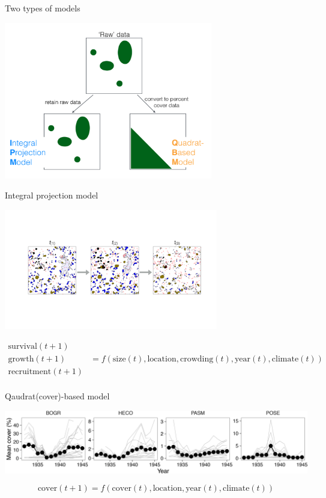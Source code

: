 \documentclass[14pt, compress, aspectratio=1610]{beamer}
\begin{document}
\begin{frame}{%
\protect\hypertarget{two-types-of-models}{%
Two types of models}}

\centering

\includegraphics[height=2.7in]{./figures/mee_flow.png}

\end{frame}

\begin{frame}{%
\protect\hypertarget{integral-projection-model}{%
Integral projection model}}

\centering

\includegraphics[width=0.7\textwidth]{./figures/maps.pdf}

\begin{align*}
\text{survival}(t+1) &\phantom{=} \\
\text{growth}(t+1) &= f\left(\text{size}(t),\text{location},\text{crowding}(t),\text{year}(t),\text{climate}(t) \right) \\
\text{recruitment}(t+1) &\phantom{=} \\
\end{align*}

\end{frame}

\begin{frame}{%
\protect\hypertarget{qaudratcover-based-model}{%
Qaudrat(cover)-based model}}

\includegraphics[width=\textwidth]{./figures/montana_quad_ts.pdf}

\[
\text{cover}(t+1) = f\left(\text{cover}(t),\text{location},\text{year}(t),\text{climate}(t) \right)
\]

\end{frame}
\end{document}
